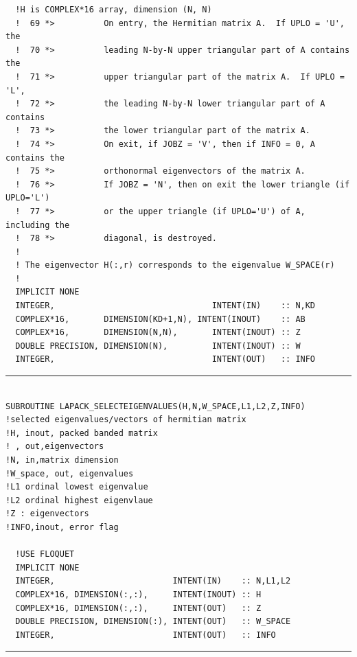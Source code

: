 \documentclass[10pt,a4paper]{article}
\begin{document}
\begin{verbatim}
  !H is COMPLEX*16 array, dimension (N, N)
  !  69 *>          On entry, the Hermitian matrix A.  If UPLO = 'U', the
  !  70 *>          leading N-by-N upper triangular part of A contains the
  !  71 *>          upper triangular part of the matrix A.  If UPLO = 'L',
  !  72 *>          the leading N-by-N lower triangular part of A contains
  !  73 *>          the lower triangular part of the matrix A.
  !  74 *>          On exit, if JOBZ = 'V', then if INFO = 0, A contains the
  !  75 *>          orthonormal eigenvectors of the matrix A.
  !  76 *>          If JOBZ = 'N', then on exit the lower triangle (if UPLO='L')
  !  77 *>          or the upper triangle (if UPLO='U') of A, including the
  !  78 *>          diagonal, is destroyed.
  !
  ! The eigenvector H(:,r) corresponds to the eigenvalue W_SPACE(r)
  !
  IMPLICIT NONE
  INTEGER,                                INTENT(IN)    :: N,KD
  COMPLEX*16,       DIMENSION(KD+1,N), INTENT(INOUT)    :: AB
  COMPLEX*16,       DIMENSION(N,N),       INTENT(INOUT) :: Z
  DOUBLE PRECISION, DIMENSION(N),         INTENT(INOUT) :: W
  INTEGER,                                INTENT(OUT)   :: INFO

\end{verbatim}
\begin{center}
\rule{12cm}{1pt}
\end{center}
\begin{verbatim}

SUBROUTINE LAPACK_SELECTEIGENVALUES(H,N,W_SPACE,L1,L2,Z,INFO)
!selected eigenvalues/vectors of hermitian matrix
!H, inout, packed banded matrix
! , out,eigenvectors
!N, in,matrix dimension
!W_space, out, eigenvalues
!L1 ordinal lowest eigenvalue
!L2 ordinal highest eigenvlaue
!Z : eigenvectors
!INFO,inout, error flag

  !USE FLOQUET
  IMPLICIT NONE
  INTEGER,                        INTENT(IN)    :: N,L1,L2
  COMPLEX*16, DIMENSION(:,:),     INTENT(INOUT) :: H
  COMPLEX*16, DIMENSION(:,:),     INTENT(OUT)   :: Z
  DOUBLE PRECISION, DIMENSION(:), INTENT(OUT)   :: W_SPACE
  INTEGER,                        INTENT(OUT)   :: INFO
\end{verbatim}
\begin{center}
\rule{12cm}{1pt}
\end{center}
\end{document}
